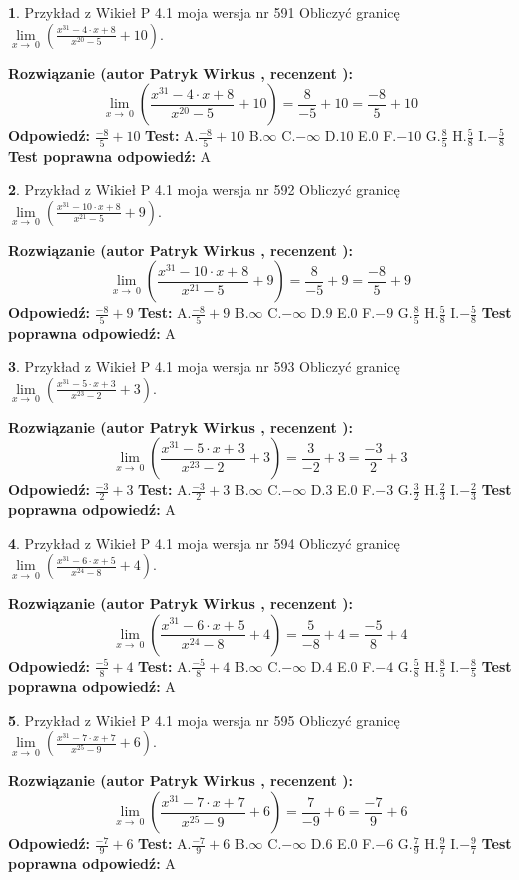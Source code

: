 \documentclass[12pt, a4paper]{article}
\theoremstyle{definition} %
\newtheorem{zad}{}
\newcommand{\zadStart}[1]{\begin{zad}#1\newline}
\newcommand{\zadStop}{\end{zad}}
\newcommand{\rozwStart}[2]{\noindent \textbf{Rozwiązanie (autor #1 , recenzent #2): }\newline}
\newcommand{\rozwStop}{\newline}
\newcommand{\odpStart}{\noindent \textbf{Odpowiedź:}\newline}
\newcommand{\odpStop}{\newline}
\newcommand{\testStart}{\noindent \textbf{Test:}\newline}
\newcommand{\testStop}{\newline}
\newcommand{\kluczStart}{\noindent \textbf{Test poprawna odpowiedź:}\newline}
\newcommand{\kluczStop}{\newline}
\begin{document}
\zadStart{Przykład z Wikieł P 4.1 moja wersja nr 591}
Obliczyć granicę $\lim\limits_{x\to\ 0}(\frac{x^{31}-4 \cdot x +8}{x^{20}-5}+10)$.
\zadStop
\rozwStart{Patryk Wirkus}{}
$$\lim\limits_{x\to\ 0}(\frac{x^{31}-4 \cdot x +8}{x^{20}-5}+10)=\frac{8}{-5}+10=\frac{-8}{5}+10$$
\rozwStop
\odpStart
$\frac{-8}{5}+10$
\odpStop
\testStart
A.$\frac{-8}{5}+10$
B.$\infty$
C.$-\infty$
D.$10$
E.$0$
F.$-10$
G.$\frac{8}{5}$
H.$\frac{5}{8}$
I.$-\frac{5}{8}$
\testStop
\kluczStart
A
\kluczStop



\zadStart{Przykład z Wikieł P 4.1 moja wersja nr 592}
Obliczyć granicę $\lim\limits_{x\to\ 0}(\frac{x^{31}-10 \cdot x +8}{x^{21}-5}+9)$.
\zadStop
\rozwStart{Patryk Wirkus}{}
$$\lim\limits_{x\to\ 0}(\frac{x^{31}-10 \cdot x +8}{x^{21}-5}+9)=\frac{8}{-5}+9=\frac{-8}{5}+9$$
\rozwStop
\odpStart
$\frac{-8}{5}+9$
\odpStop
\testStart
A.$\frac{-8}{5}+9$
B.$\infty$
C.$-\infty$
D.$9$
E.$0$
F.$-9$
G.$\frac{8}{5}$
H.$\frac{5}{8}$
I.$-\frac{5}{8}$
\testStop
\kluczStart
A
\kluczStop



\zadStart{Przykład z Wikieł P 4.1 moja wersja nr 593}
Obliczyć granicę $\lim\limits_{x\to\ 0}(\frac{x^{31}-5 \cdot x +3}{x^{23}-2}+3)$.
\zadStop
\rozwStart{Patryk Wirkus}{}
$$\lim\limits_{x\to\ 0}(\frac{x^{31}-5 \cdot x +3}{x^{23}-2}+3)=\frac{3}{-2}+3=\frac{-3}{2}+3$$
\rozwStop
\odpStart
$\frac{-3}{2}+3$
\odpStop
\testStart
A.$\frac{-3}{2}+3$
B.$\infty$
C.$-\infty$
D.$3$
E.$0$
F.$-3$
G.$\frac{3}{2}$
H.$\frac{2}{3}$
I.$-\frac{2}{3}$
\testStop
\kluczStart
A
\kluczStop



\zadStart{Przykład z Wikieł P 4.1 moja wersja nr 594}
Obliczyć granicę $\lim\limits_{x\to\ 0}(\frac{x^{31}-6 \cdot x +5}{x^{24}-8}+4)$.
\zadStop
\rozwStart{Patryk Wirkus}{}
$$\lim\limits_{x\to\ 0}(\frac{x^{31}-6 \cdot x +5}{x^{24}-8}+4)=\frac{5}{-8}+4=\frac{-5}{8}+4$$
\rozwStop
\odpStart
$\frac{-5}{8}+4$
\odpStop
\testStart
A.$\frac{-5}{8}+4$
B.$\infty$
C.$-\infty$
D.$4$
E.$0$
F.$-4$
G.$\frac{5}{8}$
H.$\frac{8}{5}$
I.$-\frac{8}{5}$
\testStop
\kluczStart
A
\kluczStop



\zadStart{Przykład z Wikieł P 4.1 moja wersja nr 595}
Obliczyć granicę $\lim\limits_{x\to\ 0}(\frac{x^{31}-7 \cdot x +7}{x^{25}-9}+6)$.
\zadStop
\rozwStart{Patryk Wirkus}{}
$$\lim\limits_{x\to\ 0}(\frac{x^{31}-7 \cdot x +7}{x^{25}-9}+6)=\frac{7}{-9}+6=\frac{-7}{9}+6$$
\rozwStop
\odpStart
$\frac{-7}{9}+6$
\odpStop
\testStart
A.$\frac{-7}{9}+6$
B.$\infty$
C.$-\infty$
D.$6$
E.$0$
F.$-6$
G.$\frac{7}{9}$
H.$\frac{9}{7}$
I.$-\frac{9}{7}$
\testStop
\kluczStart
A
\kluczStop
\end{document}
